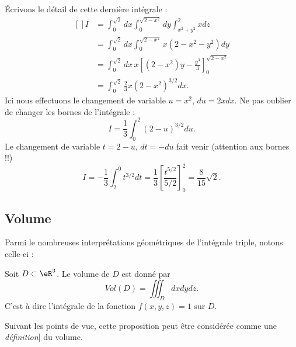 \begin{example}
    Écrivons le détail de cette dernière intégrale :
    \begin{equation}
        \begin{aligned}[]
            I&=\int_0^{\sqrt{2}}dx\int_0^{\sqrt{2-x^2}}dy\int_{x^2+y^2}^2xdz\\
            &=\int_0^{\sqrt{2}}dx\int_0^{\sqrt{2-x^2}}x(2-x^2-y^2)dy\\
            &=\int_0^{\sqrt{2}}dx\,x\left[ (2-x^2)y-\frac{ y^3 }{ 3 } \right]_0^{\sqrt{2-x^2}}\\
            &=\int_0^{\sqrt{2}}\frac{ 2 }{ 3 }x(2-x^2)^{3/2}dx.
        \end{aligned}
    \end{equation}
    Ici nous effectuons le changement de variable $u=x^2$, $du=2xdx$. Ne pas oublier de changer les bornes de l'intégrale :
    \begin{equation}
        I=\frac{1}{ 3 }\int_0^2(2-u)^{3/2}du.
    \end{equation}
    Le changement de variable $t=2-u$, $dt=-du$ fait venir (attention aux bornes !!)
    \begin{equation}
        I=-\frac{1}{ 3 }\int_2^0t^{3/2}dt=\frac{1}{ 3 }\left[ \frac{ t^{5/2} }{ 5/2 } \right]_0^2=\frac{ 8 }{ 15 }\sqrt{2}.
    \end{equation}

\end{example}

\subsection{Volume}

Parmi le nombreuses interprétations géométriques de l'intégrale triple, notons celle-ci :
\begin{proposition}
    Soit $D\subset \eR^3$. Le volume de $D$ est donné par
    \begin{equation}
        Vol(D)=\iiint_D dxdydz.
    \end{equation}
    C'est à dire l'intégrale de la fonction $f(x,y,z)=1$ sur $D$.
\end{proposition}
Suivant les points de vue, cette proposition peut être considérée comme une \emph{définition}] du volume.

